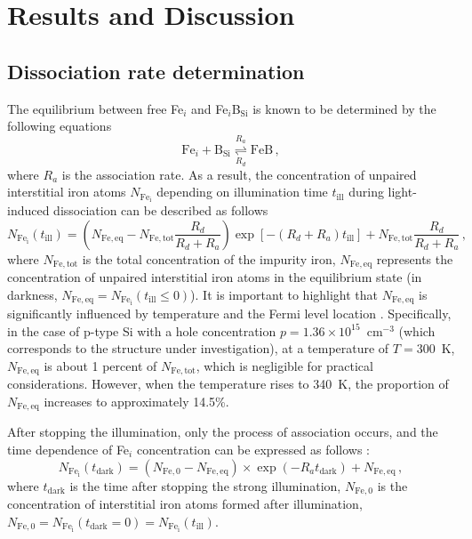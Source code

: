 \documentclass{WileyMSP-template}
\begin{document}
\section{Results and Discussion}

\subsection{Dissociation rate determination}\label{SecR}

The equilibrium between free Fe$_i$ and Fe$_i$B$_\mathrm{Si}$ is known to be determined by the following equations \cite{FeB:kinetic,Sun2021,FeBAssJAP2014}
\begin{equation}
\label{eqReac}
\mathrm{Fe}_i+\mathrm{B}_\mathrm{Si}  \overset{R_a}{\underset{R_d}{\rightleftharpoons{}}} \mathrm{FeB}\,,
\end{equation}
where
$R_a$ is the association rate.
As a result, the concentration of unpaired interstitial iron atoms $N_\mathrm{Fe_i}$ depending on illumination time $t_\mathrm{ill}$
during light-induced dissociation can be described as follows \cite{FeBLight2,FeBKin2019,Olikh2021JAP}
\begin{equation}
\label{eqNfeill}
N_\mathrm{Fe_i}(t_\mathrm{ill})=\left(N_\mathrm{Fe,eq}-N_\mathrm{Fe,tot}
\frac{R_d}{R_d+R_a}\right)\exp[-(R_d+R_a)t_\mathrm{ill}]+N_\mathrm{Fe,tot}\frac{R_d}{R_d+R_a}\,,
\end{equation}
where
$N_\mathrm{Fe,tot}$ is the total concentration of the impurity iron,
$N_\mathrm{Fe,eq}$ represents the concentration of unpaired interstitial iron atoms in the equilibrium state
(in darkness, $N_\mathrm{Fe,eq}=N_\mathrm{Fe_i}(t_\mathrm{ill}\leq0)$).
It is important to highlight that $N_\mathrm{Fe,eq}$ is significantly influenced
by temperature and the Fermi level location \cite{FeB:kinetic}.
Specifically, in the case of p-type Si with a hole concentration $p=1.36\times10^{15}$~cm$^{-3}$
(which corresponds to the structure under investigation),
at a temperature of $T=300$~K, $N_\mathrm{Fe,eq}$ is about 1 percent of $N_\mathrm{Fe,tot}$,
which is negligible for practical considerations.
However, when the temperature rises to 340~K, the proportion of $N_\mathrm{Fe,eq}$ increases to approximately 14.5\%.


After stopping the illumination, only the process of association occurs,
and the time dependence of Fe$_i$ concentration can be expressed as follows \cite{FeB:kinetic,MurphyJAP2011}:
\begin{equation}
\label{eqNFet}
N_\mathrm{Fe_i}(t_\mathrm{dark})=(N_\mathrm{Fe,0}-N_\mathrm{Fe,eq})\times
\exp(-R_a t_\mathrm{dark})+N_\mathrm{Fe,eq}\,,
\end{equation}
where $t_\mathrm{dark}$ is the time after stopping the strong illumination,
$N_\mathrm{Fe,0}$ is the concentration of interstitial iron atoms formed after illumination,
$N_\mathrm{Fe,0}=N_\mathrm{Fe_i}(t_\mathrm{dark}=0)=N_\mathrm{Fe_i}(t_\mathrm{ill})$.
\end{document}
